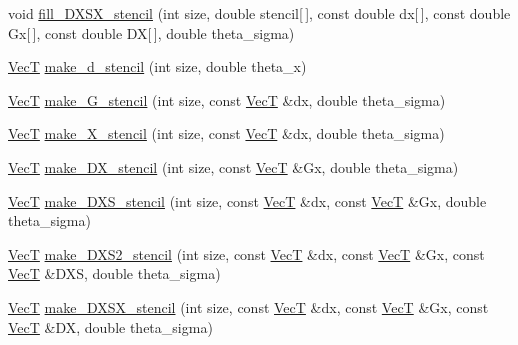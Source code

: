 \begin{DoxyCompactItemize}
\item 
void \hyperlink{namespacemappel_ad3a6553e54dc90232fc04c93731fc69c}{fill\+\_\+\+D\+X\+S\+X\+\_\+stencil} (int size, double stencil\mbox{[}$\,$\mbox{]}, const double dx\mbox{[}$\,$\mbox{]}, const double Gx\mbox{[}$\,$\mbox{]}, const double DX\mbox{[}$\,$\mbox{]}, double theta\+\_\+sigma)
\item 
\hyperlink{namespacemappel_a2225ad69f358daa3f4f99282a35b9a3a}{VecT} \hyperlink{namespacemappel_ac9d449b0121b33962da2c9c13cbb593c}{make\+\_\+d\+\_\+stencil} (int size, double theta\+\_\+x)
\item 
\hyperlink{namespacemappel_a2225ad69f358daa3f4f99282a35b9a3a}{VecT} \hyperlink{namespacemappel_aa5c2f294298c875605ee1e9876b7d116}{make\+\_\+\+G\+\_\+stencil} (int size, const \hyperlink{namespacemappel_a2225ad69f358daa3f4f99282a35b9a3a}{VecT} \&dx, double theta\+\_\+sigma)
\item 
\hyperlink{namespacemappel_a2225ad69f358daa3f4f99282a35b9a3a}{VecT} \hyperlink{namespacemappel_a7b50d0a17c085d9b25b91c2b17ecb1cc}{make\+\_\+\+X\+\_\+stencil} (int size, const \hyperlink{namespacemappel_a2225ad69f358daa3f4f99282a35b9a3a}{VecT} \&dx, double theta\+\_\+sigma)
\item 
\hyperlink{namespacemappel_a2225ad69f358daa3f4f99282a35b9a3a}{VecT} \hyperlink{namespacemappel_a8da88490d6ff7d5886b96b66c1bab369}{make\+\_\+\+D\+X\+\_\+stencil} (int size, const \hyperlink{namespacemappel_a2225ad69f358daa3f4f99282a35b9a3a}{VecT} \&Gx, double theta\+\_\+sigma)
\item 
\hyperlink{namespacemappel_a2225ad69f358daa3f4f99282a35b9a3a}{VecT} \hyperlink{namespacemappel_af7636db506977133c8b30d108fede711}{make\+\_\+\+D\+X\+S\+\_\+stencil} (int size, const \hyperlink{namespacemappel_a2225ad69f358daa3f4f99282a35b9a3a}{VecT} \&dx, const \hyperlink{namespacemappel_a2225ad69f358daa3f4f99282a35b9a3a}{VecT} \&Gx, double theta\+\_\+sigma)
\item 
\hyperlink{namespacemappel_a2225ad69f358daa3f4f99282a35b9a3a}{VecT} \hyperlink{namespacemappel_aef14b765af6f9b85d93f42ab8b84311b}{make\+\_\+\+D\+X\+S2\+\_\+stencil} (int size, const \hyperlink{namespacemappel_a2225ad69f358daa3f4f99282a35b9a3a}{VecT} \&dx, const \hyperlink{namespacemappel_a2225ad69f358daa3f4f99282a35b9a3a}{VecT} \&Gx, const \hyperlink{namespacemappel_a2225ad69f358daa3f4f99282a35b9a3a}{VecT} \&D\+XS, double theta\+\_\+sigma)
\item 
\hyperlink{namespacemappel_a2225ad69f358daa3f4f99282a35b9a3a}{VecT} \hyperlink{namespacemappel_abccec04f04b0b10940779c9bbae0e570}{make\+\_\+\+D\+X\+S\+X\+\_\+stencil} (int size, const \hyperlink{namespacemappel_a2225ad69f358daa3f4f99282a35b9a3a}{VecT} \&dx, const \hyperlink{namespacemappel_a2225ad69f358daa3f4f99282a35b9a3a}{VecT} \&Gx, const \hyperlink{namespacemappel_a2225ad69f358daa3f4f99282a35b9a3a}{VecT} \&DX, double theta\+\_\+sigma)

\end{DoxyCompactItemize}
